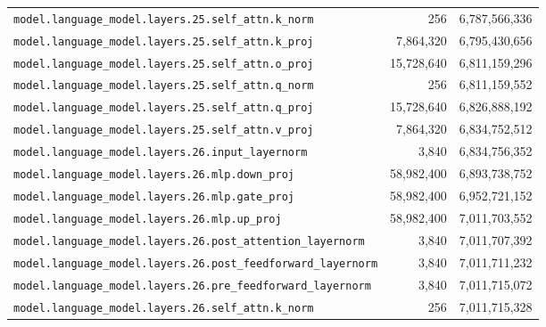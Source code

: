 \documentclass[10pt,a4paper]{article}
\theoremstyle{definition}
\begin{document}
\begin{appendices}
\begin{longtable}{p{9.5cm}rr}
\texttt{model.\allowbreak{}language\_model.\allowbreak{}layers.\allowbreak{}25.\allowbreak{}self\_attn.\allowbreak{}k\_norm} & 256 & 6,787,566,336 \\
\texttt{model.\allowbreak{}language\_model.\allowbreak{}layers.\allowbreak{}25.\allowbreak{}self\_attn.\allowbreak{}k\_proj} & 7,864,320 & 6,795,430,656 \\
\texttt{model.\allowbreak{}language\_model.\allowbreak{}layers.\allowbreak{}25.\allowbreak{}self\_attn.\allowbreak{}o\_proj} & 15,728,640 & 6,811,159,296 \\
\texttt{model.\allowbreak{}language\_model.\allowbreak{}layers.\allowbreak{}25.\allowbreak{}self\_attn.\allowbreak{}q\_norm} & 256 & 6,811,159,552 \\
\texttt{model.\allowbreak{}language\_model.\allowbreak{}layers.\allowbreak{}25.\allowbreak{}self\_attn.\allowbreak{}q\_proj} & 15,728,640 & 6,826,888,192 \\
\texttt{model.\allowbreak{}language\_model.\allowbreak{}layers.\allowbreak{}25.\allowbreak{}self\_attn.\allowbreak{}v\_proj} & 7,864,320 & 6,834,752,512 \\
\texttt{model.\allowbreak{}language\_model.\allowbreak{}layers.\allowbreak{}26.\allowbreak{}input\_layernorm} & 3,840 & 6,834,756,352 \\
\texttt{model.\allowbreak{}language\_model.\allowbreak{}layers.\allowbreak{}26.\allowbreak{}mlp.\allowbreak{}down\_proj} & 58,982,400 & 6,893,738,752 \\
\texttt{model.\allowbreak{}language\_model.\allowbreak{}layers.\allowbreak{}26.\allowbreak{}mlp.\allowbreak{}gate\_proj} & 58,982,400 & 6,952,721,152 \\
\texttt{model.\allowbreak{}language\_model.\allowbreak{}layers.\allowbreak{}26.\allowbreak{}mlp.\allowbreak{}up\_proj} & 58,982,400 & 7,011,703,552 \\
\texttt{model.\allowbreak{}language\_model.\allowbreak{}layers.\allowbreak{}26.\allowbreak{}post\_attention\_layernorm} & 3,840 & 7,011,707,392 \\
\texttt{model.\allowbreak{}language\_model.\allowbreak{}layers.\allowbreak{}26.\allowbreak{}post\_feedforward\_layernorm} & 3,840 & 7,011,711,232 \\
\texttt{model.\allowbreak{}language\_model.\allowbreak{}layers.\allowbreak{}26.\allowbreak{}pre\_feedforward\_layernorm} & 3,840 & 7,011,715,072 \\
\texttt{model.\allowbreak{}language\_model.\allowbreak{}layers.\allowbreak{}26.\allowbreak{}self\_attn.\allowbreak{}k\_norm} & 256 & 7,011,715,328 \\

\end{longtable}
\end{appendices}
\end{document}
